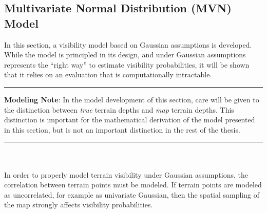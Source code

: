 %

\subsection{Multivariate Normal Distribution (MVN) Model}
\label{visibility.Visibility.MVN}

In this section, a visibility model based on Gaussian assumptions is developed.
While the model is principled in its design, and under Gaussian assumptions represents the ``right way'' to estimate visibility probabilities, it will be shown that it relies on an evaluation that is computationally intractable.
\\
\rule{\textwidth}{1pt}

\noindent \textbf{Modeling Note}: In the model development of this section, care will be given to the distinction between \emph{true} terrain depths and \emph{map} terrain depths.  
This distinction is important for the mathematical derivation of the model presented in this section, but is not an important distinction in the rest of the thesis.

\noindent \rule{\textwidth}{1pt}
\\ \\
In order to properly model terrain visibility under Gaussian assumptions, the correlation between terrain points must be modeled.  If terrain points are modeled as uncorrelated, for example as univariate Gaussian, then the spatial sampling of the map strongly affects visibility probabilities.


